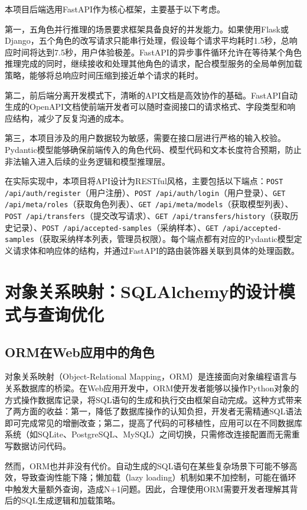 \documentclass[12pt,a4paper]{ctexart}
\begin{document}
本项目后端选用FastAPI作为核心框架，主要基于以下考虑。

第一，五角色并行推理的场景要求框架具备良好的并发能力。如果使用Flask或Django，五个角色的改写请求只能串行处理，假设每个请求平均耗时1.5秒，总响应时间将达到7.5秒，用户体验极差。FastAPI的异步事件循环允许在等待某个角色推理完成的同时，继续接收和处理其他角色的请求，配合模型服务的全局单例加载策略，能够将总响应时间压缩到接近单个请求的耗时。

第二，前后端分离开发模式下，清晰的API文档是高效协作的基础。FastAPI自动生成的OpenAPI文档使前端开发者可以随时查阅接口的请求格式、字段类型和响应结构，减少了反复沟通的成本。

第三，本项目涉及的用户数据较为敏感，需要在接口层进行严格的输入校验。Pydantic模型能够确保前端传入的角色代码、模型代码和文本长度符合预期，防止非法输入进入后续的业务逻辑和模型推理层。

在实际实现中，本项目将API设计为RESTful风格，主要包括以下端点：\texttt{POST /api/auth/register}（用户注册）、\texttt{POST /api/auth/login}（用户登录）、\texttt{GET /api/meta/roles}（获取角色列表）、\texttt{GET /api/meta/models}（获取模型列表）、\texttt{POST /api/transfers}（提交改写请求）、\texttt{GET /api/transfers/history}（获取历史记录）、\texttt{POST /api/accepted-samples}（采纳样本）、\texttt{GET /api/accepted-samples}（获取采纳样本列表，管理员权限）。每个端点都有对应的Pydantic模型定义请求体和响应体的结构，并通过FastAPI的路由装饰器关联到具体的处理函数。

\section{对象关系映射：SQLAlchemy的设计模式与查询优化}

\subsection{ORM在Web应用中的角色}

对象关系映射（Object-Relational Mapping，ORM）是连接面向对象编程语言与关系数据库的桥梁。在Web应用开发中，ORM使开发者能够以操作Python对象的方式操作数据库记录，将SQL语句的生成和执行交由框架自动完成。这种方式带来了两方面的收益：第一，降低了数据库操作的认知负担，开发者无需精通SQL语法即可完成常见的增删改查；第二，提高了代码的可移植性，应用可以在不同数据库系统（如SQLite、PostgreSQL、MySQL）之间切换，只需修改连接配置而无需重写数据访问代码。

然而，ORM也并非没有代价。自动生成的SQL语句在某些复杂场景下可能不够高效，导致查询性能下降；懒加载（lazy loading）机制如果不加控制，可能在循环中触发大量额外查询，造成N+1问题。因此，合理使用ORM需要开发者理解其背后的SQL生成逻辑和加载策略。
\end{document}
